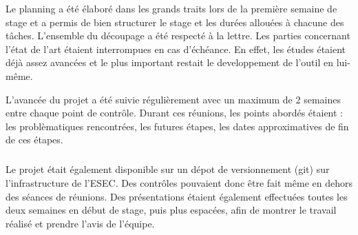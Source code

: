 Le planning a été élaboré dans les grands traits lors de la première semaine de stage et a permis de bien structurer
le stage et les durées allouées à chacune des tâches. L'ensemble du découpage a été respecté à la lettre. Les parties
concernant l'état de l'art étaient interrompues en cas d'échéance. En effet, les études étaient déjà assez avancées et le plus
important restait le developpement de l'outil en lui-même.

L'avancée du projet a été suivie régulièrement avec un maximum de 2 semaines entre chaque point de contrôle. Durant ces réunions,
les points abordés étaient : les problèmatiques rencontrées, les futures étapes, les dates approximatives de fin de ces étapes.

\subparagraph{}
Le projet était également disponible sur un dépot de versionnement (git) sur l'infrastructure de l'ESEC. Des contrôles pouvaient donc être
fait même en dehors des séances de réunions. Des présentations étaient également effectuées toutes les deux semaines en début de stage, puis plus
espacées, afin de montrer le travail réalisé et prendre l'avis de l'équipe.

